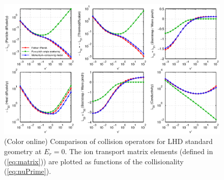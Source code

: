 \documentclass[12pt]{revtex4}
\begin{document}
\begin{figure}[h!]
\includegraphics{m20131208_01_plotSFINCSFortranAndMatlabNuScansForPaper_LHD.eps}
\caption{(Color online) Comparison of collision operators for LHD standard geometry at $E_r=0$.
The ion transport matrix elements (defined in (\ref{eq:matrix})) are plotted as functions
of the collisionality (\ref{eq:nuPrime}).
\label{fig:collisionComparison_LHD}}
\end{figure}
\end{document}
